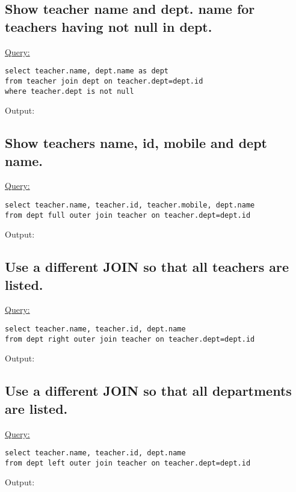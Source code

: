 \documentclass[a4paper,11pt]{article}
\begin{document}
\subsection{Show teacher name and dept. name for teachers having not null in dept.}
\underline{Query:}
\begin{lstlisting}[showstringspaces=false]
select teacher.name, dept.name as dept
from teacher join dept on teacher.dept=dept.id
where teacher.dept is not null
\end{lstlisting}
Output:
\begin{figure}[H]
\centering
{}
\end{figure}
\bigskip

\subsection{Show teachers name, id, mobile and dept name.}
\underline{Query:}
\begin{lstlisting}[showstringspaces=false]
select teacher.name, teacher.id, teacher.mobile, dept.name 
from dept full outer join teacher on teacher.dept=dept.id
\end{lstlisting}
Output:
\begin{figure}[H]
\centering
{}
\end{figure}
\medskip
\subsection{Use a different JOIN so that all teachers are listed.}
\underline{Query:}
\begin{lstlisting}[showstringspaces=false]
select teacher.name, teacher.id, dept.name 
from dept right outer join teacher on teacher.dept=dept.id
\end{lstlisting}
Output:
\begin{figure}[H]
\centering
{}
\end{figure}
\medskip
\subsection{Use a different JOIN so that all departments are listed.}
\underline{Query:}
\begin{lstlisting}[showstringspaces=false]
select teacher.name, teacher.id, dept.name 
from dept left outer join teacher on teacher.dept=dept.id
\end{lstlisting}
Output:
\begin{figure}[H]
\centering
{}
\end{figure}
\bigskip
\end{document}
